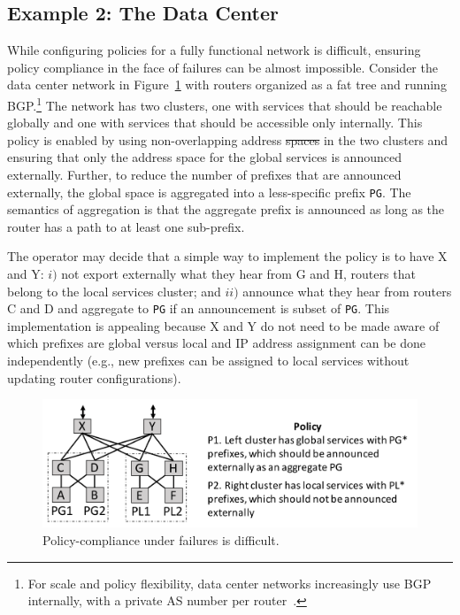 \documentclass{sig-alternate-10pt}
\newcommand{\CD}[1]{\texttt{\small #1}}  %
\providecommand{\DIFadd}[1]{{\protect\color{blue}\uwave{#1}}} %
\providecommand{\DIFdel}[1]{{\protect\color{red}\sout{#1}}}                      %
\providecommand{\DIFaddbegin}{} %
\providecommand{\DIFaddend}{} %
\providecommand{\DIFdelbegin}{} %
\providecommand{\DIFdelend}{} %
\begin{document}
\DIFdelend \subsection{Example 2:  The Data Center}

 While configuring policies for a fully functional network is difficult, ensuring policy compliance in the face of failures can be almost impossible. Consider the data center network in Figure~\ref{fig:example2} with routers organized as a fat tree and running BGP.\footnote{For scale and policy flexibility, data center networks increasingly use BGP internally, with a private AS number per router~\cite{bgp-in-dc}.} The network has two clusters, one with services that should be reachable globally and one with services that should be accessible only internally. This policy is enabled by using non-overlapping address \DIFdelbegin \DIFdel{spaces }\DIFdelend \DIFaddbegin \DIFadd{space }\DIFaddend in the two clusters and ensuring that only the address space for the global services is announced externally. Further, to reduce the number of prefixes that are announced externally, the global space is aggregated into a less-specific prefix \CD{PG}. The semantics of aggregation is that the aggregate prefix is announced as long as the router has a path to at least one sub-prefix.

The operator may decide that a simple way to implement the policy is to have X and Y: $i)$ not export externally what they hear from G and H, routers that belong to the local services cluster; and $ii)$ announce what they hear from routers C and D and aggregate to \CD{PG} if an announcement is subset of \CD{PG}. This implementation is appealing because X and Y do not need to be made aware of which prefixes are global versus local and IP address assignment can be done independently (e.g., new prefixes can be assigned to local services without updating router configurations).

\begin{figure}[t!]
  \centering
  \includegraphics[width=\columnwidth]{figures/example2}
  \caption{Policy-compliance under failures is difficult.}
  \label{fig:example2}
  \vspace{-1em}
\end{figure}
\end{document}
